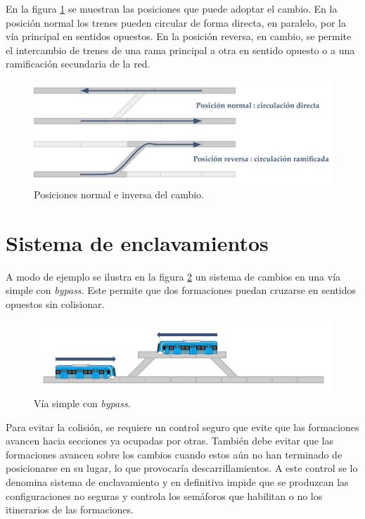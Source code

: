 			En la figura \ref{fig:Cambios} se muestran las posiciones que puede adoptar el cambio. En la posición normal los trenes pueden circular de forma directa, en paralelo, por la vía principal en sentidos opuestos. En la posición reversa, en cambio, se permite el intercambio de trenes de una rama principal a otra en sentido opuesto o a una ramificación secundaria de la red.
			
			\begin{figure}[h!]
				\centering
				\includegraphics[scale=.4]{./Figures/Cambios}
				\caption{Posiciones normal e inversa del cambio.}
				\label{fig:Cambios}
			\end{figure} 	
					
	\section{Sistema de enclavamientos}

		A modo de ejemplo se ilustra en la figura \ref{fig:Bypass} un sistema de cambios en una vía simple con \emph{bypass}. Este permite que dos formaciones puedan cruzarse en sentidos opuestos sin colisionar.
	
		\begin{figure}[h!]
			\centering
			\includegraphics[scale=.45]{./Figures/Bypass_2}
			\caption{Vía simple con \textit{bypass}.}
			\label{fig:Bypass}
		\end{figure}
			
		Para evitar la colisión, se requiere un control seguro que evite que las formaciones avancen hacia secciones ya ocupadas por otras. También debe evitar que las formaciones avancen sobre los cambios cuando estos aún no han terminado de posicionarse en su lugar, lo que provocaría descarrillamientos. A este control se lo denomina sistema de enclavamiento y en definitiva impide que se produzcan las configuraciones no seguras y controla los semáforos que habilitan o no los itinerarios de las formaciones.		
					 
